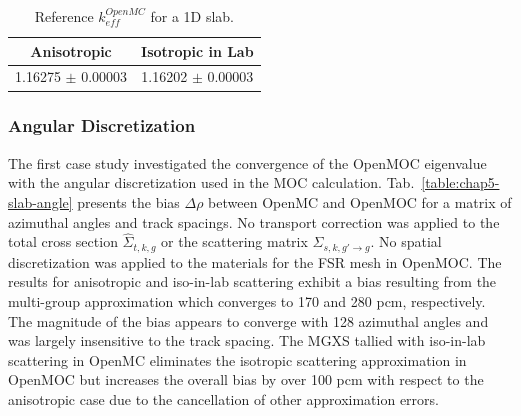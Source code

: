 \begin{table}[h!]
  \centering
  \caption[Reference $k^{OpenMC}_{eff}$ for a 1D slab]{Reference $k^{OpenMC}_{eff}$ for a 1D slab.}
  \small
  \label{table:chap5-slab-reference} 
  \vspace{6pt}
  \begin{tabular}{c c}
  \toprule
  \rowcolor{lightgray}
  {\cellcolor{carolinablue} {\bf Anisotropic}} &
  {\cellcolor{lightgreen} {\bf Isotropic in Lab}} \\
  \midrule
  1.16275 $\pm$ 0.00003 & 1.16202 $\pm$ 0.00003 \\
  \bottomrule
\end{tabular}
\end{table}

\subsubsection{Angular Discretization}
\label{subsubsec:chap5-slab-angle}

The first case study investigated the convergence of the OpenMOC eigenvalue with the angular discretization used in the \ac{MOC} calculation. Tab.~\ref{table:chap5-slab-angle} presents the bias $\Delta\rho$ between OpenMC and OpenMOC for a matrix of azimuthal angles and track spacings. No transport correction was applied to the total cross section $\hat{\Sigma}_{t,k,g}$ or the scattering matrix $\hat{\Sigma}_{s,k,g'\rightarrow g}$. No spatial discretization was applied to the materials for the \ac{FSR} mesh in OpenMOC. The results for anisotropic and iso-in-lab scattering exhibit a bias resulting from the multi-group approximation which converges to 170 and 280 pcm, respectively. The magnitude of the bias appears to converge with 128 azimuthal angles and was largely insensitive to the track spacing. The \ac{MGXS} tallied with iso-in-lab scattering in OpenMC eliminates the isotropic scattering approximation in OpenMOC but increases the overall bias by over 100 \ac{pcm} with respect to the anisotropic case due to the cancellation of other approximation errors.

